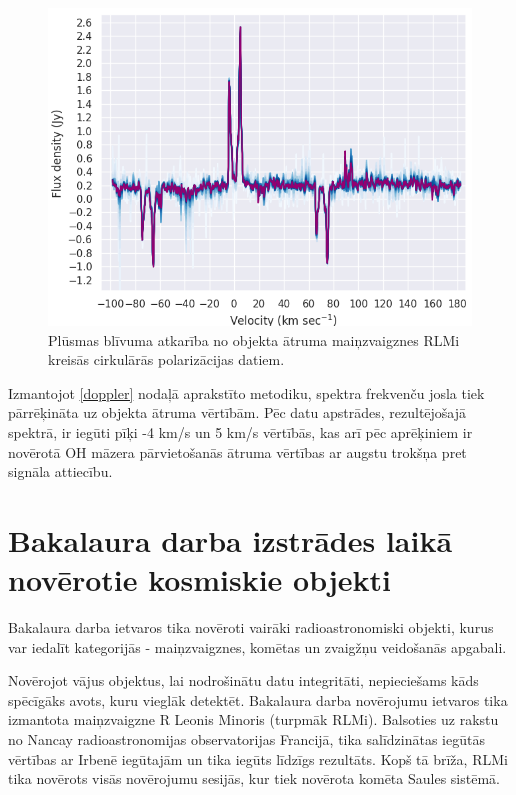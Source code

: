 \begin{figure}[H]

\centering
\includegraphics[width=\textwidth]{images/created/rlmi-doppler.png}
\caption{Plūsmas blīvuma atkarība no objekta ātruma maiņzvaigznes RLMi kreisās cirkulārās polarizācijas datiem.}
\label{fig:rlmi-doppler}
\end{figure}
Izmantojot \ref{doppler} nodaļā aprakstīto metodiku, spektra frekvenču josla tiek pārrēķināta uz objekta ātruma vērtībām. Pēc datu apstrādes, rezultējošajā spektrā, ir iegūti pīķi -4 km/s un 5 km/s vērtībās, kas arī pēc aprēķiniem ir novērotā OH māzera pārvietošanās ātruma vērtības ar augstu trokšņa pret signāla attiecību.


\section{Bakalaura darba izstrādes laikā novērotie kosmiskie objekti} \label{objects}


Bakalaura darba ietvaros tika novēroti vairāki radioastronomiski objekti, kurus var iedalīt kategorijās - maiņzvaigznes, komētas un zvaigžņu veidošanās apgabali.

Novērojot vājus objektus, lai nodrošinātu datu integritāti, nepieciešams kāds spēcīgāks avots, kuru vieglāk detektēt. Bakalaura darba novērojumu ietvaros tika izmantota maiņzvaigzne R Leonis Minoris (turpmāk RLMi). Balsoties uz rakstu no Nancay radioastronomijas observatorijas Francijā, \cite{nancay} tika salīdzinātas iegūtās vērtības ar Irbenē iegūtajām un tika iegūts līdzīgs rezultāts. Kopš tā brīža, RLMi tika novērots visās novērojumu sesijās, kur tiek novērota komēta Saules sistēmā.

